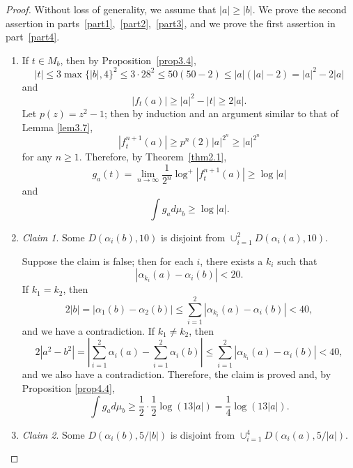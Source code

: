 \documentclass[11pt]{amsart}
\numberwithin{equation}{section}
\theoremstyle{plain}
\theoremstyle{definition}
\theoremstyle{remark}
\newtheorem*{claim*}{Claim}
\begin{document}
\begin{proof}
Without loss of generality, we assume that $|a|\geq|b|$. We prove
the second assertion in parts~\eqref{part1},~\eqref{part2},~\eqref{part3},  and we prove the first assertion in part~\eqref{part4}.

\begin{enumerate}[wide]
  \item\label{part1}
  If $t\in M_{b}$, then
by Proposition~\ref{prop3.4},
\[
|t|\leq3\max\{|b|,4\}^{2}\leq3\cdot28^{2}\leq50(50-2)\leq|a|(|a|-2)=|a|^{2}-2|a|
\]
and
\[
|f_{t}(a)|\geq|a|^{2}-|t|\geq2|a|.
\]
Let $p(z)=z^{2}-1$; then by induction and an argument similar to that of Lemma
\ref{lem3.7},
\[
\left|f_{t}^{n+1}(a)\right|\geq p^{n}(2)|a|^{2^{n}}\geq|a|^{2^{n}}
\]
for any $n\geq1$. Therefore, by Theorem~\ref{thm2.1},
\[
g_{a}(t)=\lim_{n\to\infty}\frac{1}{2^{n}}\log^{+}\left|f_{t}^{n+1}(a)\right|\geq\log|a|
\]
and
\[
\int g_{a}d\mu_{b}\geq\log|a|.
\]

\item\label{part2}

\begin{claim*}
  Some $D(\alpha_{i}(b),10)$ is disjoint from $\cup_{i=1}^{2}D(\alpha_{i}(a),10)$.
\end{claim*}

Suppose the claim is false; then for each $i$, there exists a $k_{i}$ such that
\[
\left|\alpha_{k_{i}}(a)-\alpha_{i}(b)\right|<20.
\]
If $k_{1}=k_{2}$, then
\[
2|b|=|\alpha_{1}(b)-\alpha_{2}(b)|\leq\sum_{i=1}^{2}|\alpha_{k_{i}}(a)-\alpha_{i}(b)|<40,
\]
and we have a contradiction. If $k_{1}\neq k_{2}$, then
\[
2\left|a^{2}-b^{2}\right|=\left|\sum_{i=1}^{2}\alpha_{i}(a)-\sum_{i=1}^{2}\alpha_{i}(b)\right|\leq\sum_{i=1}^{2}\left|\alpha_{k_{i}}(a)-\alpha_{i}(b)\right|<40,
\]
and we also have a contradiction. Therefore, the claim is proved and, by Proposition
\ref{prop4.4},
\[
\int g_{a}d\mu_{b}\geq\frac{1}{2}\cdot\frac{1}{2}\log(13|a|)=\frac{1}{4}\log(13|a|).
\]

\item\label{part3}
  
\begin{claim*} Some $D(\alpha_{i}(b),5/|b|)$ is disjoint from $\cup_{i=1}^{4}D(\alpha_{i}(a),5/|a|)$.
\end{claim*}


\end{enumerate}
\end{proof}
\end{document}
